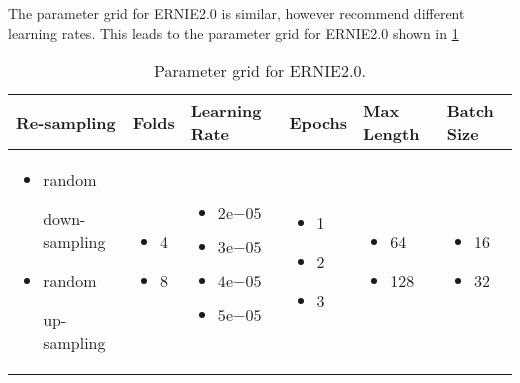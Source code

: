 The parameter grid for \ac{ERNIE2.0} is similar, however \textcite{Sun:2019a} recommend different learning rates.
This leads to the parameter grid for \ac{ERNIE2.0} shown in \cref{tab:study:execution:paramter_grid:ERNIE2.0}
\begin{table}[htpb]
    \centering
    \begin{tabular}{ p{3.5cm} p{1.5cm} p{2cm} p{1.5cm} p{1.6cm} p{1.5cm} }
        \toprule
         Re-sampling & Folds & Learning Rate & Epochs & Max Length & Batch Size \\
        \midrule
            \begin{itemize}[noitemsep,topsep=0pt,leftmargin=15pt]
                \item {random

                down-sampling}
                \item {random

                up-sampling}
            \end{itemize}
            &\begin{itemize}[noitemsep,topsep=0pt,leftmargin=15pt]
                \item 4
                \item 8
            \end{itemize}
            & \begin{itemize}[noitemsep,topsep=0pt,leftmargin=15pt]
                \item $2\mathrm{e}{-05}$
                \item $3\mathrm{e}{-05}$
                \item $4\mathrm{e}{-05}$
                \item $5\mathrm{e}{-05}$
            \end{itemize}
            & \begin{itemize}[noitemsep,topsep=0pt,leftmargin=15pt]
                \item 1
                \item 2
                \item 3
            \end{itemize}
            & \begin{itemize}[noitemsep,topsep=0pt,leftmargin=15pt]
                \item 64
                \item 128
            \end{itemize}
            & \begin{itemize}[noitemsep,topsep=0pt,leftmargin=15pt]
                \item 16
                \item 32
            \end{itemize}\\
        \bottomrule
    \end{tabular}
    \caption[Parameter Grid for \ac{ERNIE2.0}]{Parameter grid for \ac{ERNIE2.0}.}\label{tab:study:execution:paramter_grid:ERNIE2.0}
\end{table}

